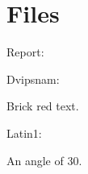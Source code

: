 \documentclass{report}
\begin{document}
\chapter{Files}
Report: \ownreport

Dvipsnam: \owndvipsnam

\textcolor{BrickRed}{Brick red text.}

Latin1: \ownlatin

An angle of 30\textdegree.
\end{document}
